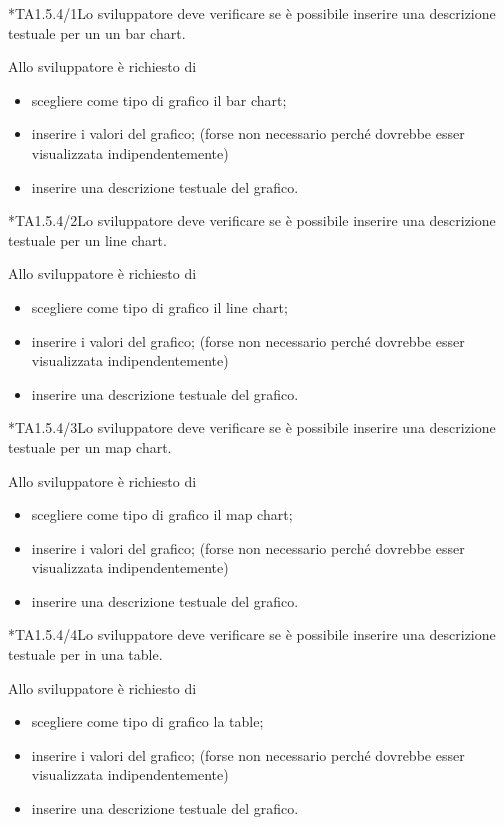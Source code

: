 	*{TA1.5.4/1}Lo sviluppatore deve verificare se è possibile inserire una descrizione testuale per un un bar chart.

		Allo sviluppatore è richiesto di
		\begin{itemize}
			\item scegliere come tipo di grafico il bar chart;
			\item inserire i valori del grafico; (forse non necessario perché dovrebbe esser visualizzata indipendentemente)
			\item inserire una descrizione testuale del grafico.
		\end{itemize}

	*{TA1.5.4/2}Lo sviluppatore deve verificare se è possibile inserire una descrizione testuale per un line chart.

		Allo sviluppatore è richiesto di
		\begin{itemize}
			\item scegliere come tipo di grafico il line chart;
			\item inserire i valori del grafico; (forse non necessario perché dovrebbe esser visualizzata indipendentemente)
			\item inserire una descrizione testuale del grafico.
		\end{itemize}

	*{TA1.5.4/3}Lo sviluppatore deve verificare se è possibile inserire una descrizione testuale per un map chart.

		Allo sviluppatore è richiesto di
		\begin{itemize}
			\item scegliere come tipo di grafico il map chart;
			\item inserire i valori del grafico; (forse non necessario perché dovrebbe esser visualizzata indipendentemente)
			\item inserire una descrizione testuale del grafico.
		\end{itemize}

	*{TA1.5.4/4}Lo sviluppatore deve verificare se è possibile inserire una descrizione testuale per in una table.

		Allo sviluppatore è richiesto di
		\begin{itemize}
			\item scegliere come tipo di grafico la table;
			\item inserire i valori del grafico; (forse non necessario perché dovrebbe esser visualizzata indipendentemente)
			\item inserire una descrizione testuale del grafico.
		\end{itemize}

